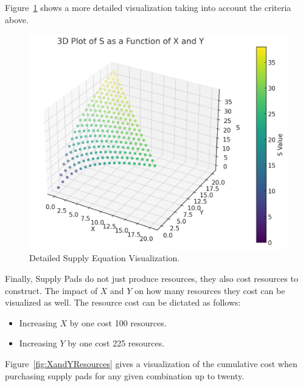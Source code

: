 \documentclass[a4paper, 12pt, english]{article}
\begin{document}
Figure~\ref{fig:XandYRelations} shows a more detailed visualization taking into account the criteria above.

\newpage

 \begin{figure}[!ht]
 			\begin{center}
				\includegraphics[width=150mm,scale=1.0]{SasfunctionofXandY.png}
			\end{center}
       		\caption{\label{fig:XandYRelations}Detailed Supply Equation Visualization.}
 \end{figure}


 Finally, Supply Pads do not just produce resources, they also cost resources to construct. The impact of $X$ and $Y$ on how many resources they cost can be visualized as well. The resource cost can be dictated as follows: 
\begin{itemize}
    \item Increasing $X$ by one cost 100 resources.
    \item Increasing $Y$ by one cost 225 resources.
\end{itemize}

 Figure~\ref{fig:XandYResources} gives a visualization of the cumulative cost when purchasing supply pads for any given combination up to twenty.
\end{document}
